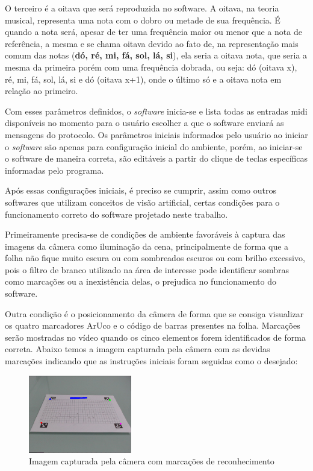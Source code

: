 \documentclass[12pt]{report}
\begin{document}
O terceiro é a oitava que será reproduzida no software. A oitava, na
teoria musical, representa uma nota com o dobro ou metade de sua
frequência. É quando a nota será, apesar de ter uma frequência maior
ou menor que a nota de referência, a mesma e se chama oitava devido ao
fato de, na representação mais comum das notas ({\bf dó, ré, mi, fá, sol,
lá, si}), ela seria a oitava nota, que seria a mesma da primeira porém
com uma frequência dobrada, ou seja: dó (oitava x), ré, mi, fá, sol,
lá, si e dó (oitava x+1), onde o último só e a oitava nota em relação
ao primeiro.

Com esses parâmetros definidos, o {\it software} inicia-se e lista
todas as entradas midi disponíveis no momento para o usuário escolher
a que o software enviará as mensagens do protocolo. Os parâmetros
iniciais informados pelo usuário ao iniciar o {\it software} são
apenas para configuração inicial do ambiente, porém, ao iniciar-se o
software de maneira correta, são editáveis a partir do clique de
teclas específicas informadas pelo programa.

Após essas configurações iniciais, é preciso se cumprir, assim como
outros softwares que utilizam conceitos de visão artificial, certas
condições para o funcionamento correto do software projetado neste
trabalho.

Primeiramente precisa-se de condições de ambiente favoráveis à captura
das imagens da câmera como iluminação da cena, principalmente de forma
que a folha não fique muito escura ou com sombreados escuros ou com
brilho excessivo, pois o filtro de branco utilizado na área de
interesse pode identificar sombras como marcações ou a inexistência
delas, o prejudica no funcionamento do software.

Outra condição é o posicionamento da câmera de forma que se consiga
visualizar os quatro marcadores ArUco e o código de barras presentes
na folha. Marcações serão mostradas no vídeo quando os cinco elementos
forem identificados de forma correta. Abaixo temos a imagem capturada
pela câmera com as devidas marcações indicando que as instruções
iniciais foram seguidas como o desejado:

\begin{figure}[H]
  \centering
    \includegraphics[width=0.4\textwidth]{imagens/video_com_marcacoes.png}
    \caption{Imagem capturada pela câmera com marcações de reconhecimento}
    \label{fig:tudo_ok}
\end{figure}
\end{document}
